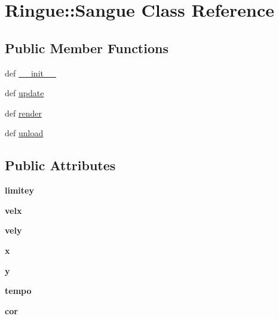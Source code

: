 \hypertarget{class_ringue_1_1_sangue}{
\section{Ringue::Sangue Class Reference}
\label{class_ringue_1_1_sangue}
}
\subsection*{Public Member Functions}
\begin{CompactItemize}
\item 
def \hyperlink{class_ringue_1_1_sangue_44a8690011bc18b7a8950defe8cc426f}{\_\-\_\-init\_\-\_\-}
\item 
def \hyperlink{class_ringue_1_1_sangue_21053d5c58557427f5d36d58b7982543}{update}
\item 
def \hyperlink{class_ringue_1_1_sangue_a2c55aba76a9fcafd4324738c450ff88}{render}
\item 
def \hyperlink{class_ringue_1_1_sangue_ea6f65ab9835bb9fda4caff21083fe66}{unload}
\end{CompactItemize}
\subsection*{Public Attributes}
\begin{CompactItemize}
\item 
\hypertarget{class_ringue_1_1_sangue_9f330ba256670258b6ca8d99b20eb91e}{
\textbf{limitey}}
\label{class_ringue_1_1_sangue_9f330ba256670258b6ca8d99b20eb91e}

\item 
\hypertarget{class_ringue_1_1_sangue_2293ed3d47716747b197523d242f1e80}{
\textbf{velx}}
\label{class_ringue_1_1_sangue_2293ed3d47716747b197523d242f1e80}

\item 
\hypertarget{class_ringue_1_1_sangue_e26af4a3a62db10229479228d32fb938}{
\textbf{vely}}
\label{class_ringue_1_1_sangue_e26af4a3a62db10229479228d32fb938}

\item 
\hypertarget{class_ringue_1_1_sangue_10a3c2af1e561ccb5422adbdca698387}{
\textbf{x}}
\label{class_ringue_1_1_sangue_10a3c2af1e561ccb5422adbdca698387}

\item 
\hypertarget{class_ringue_1_1_sangue_92b31872894e8244e1d62c27dfaf1078}{
\textbf{y}}
\label{class_ringue_1_1_sangue_92b31872894e8244e1d62c27dfaf1078}

\item 
\hypertarget{class_ringue_1_1_sangue_8ed21d2925fc7396361419275cea7da1}{
\textbf{tempo}}
\label{class_ringue_1_1_sangue_8ed21d2925fc7396361419275cea7da1}

\item 
\hypertarget{class_ringue_1_1_sangue_1d19200ae1f1781c128596000e52dcf5}{
\textbf{cor}}
\label{class_ringue_1_1_sangue_1d19200ae1f1781c128596000e52dcf5}

\end{CompactItemize}


